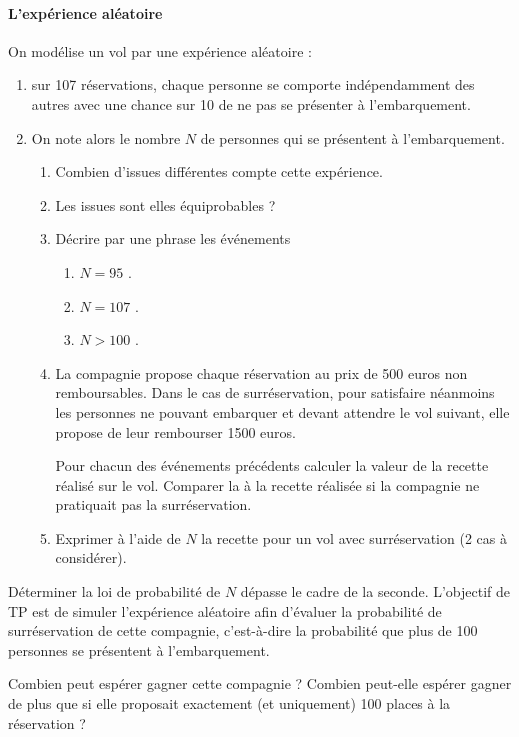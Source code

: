 \documentclass[main.tex]{subfiles}
\begin{document}
\paragraph{L'expérience aléatoire}
On modélise un vol par une expérience aléatoire :
\begin{enumerate}[label=\arabic*),leftmargin=*]
	\item sur 107 réservations, chaque personne se comporte indépendamment des autres avec une chance sur 10 de ne pas se présenter à l'embarquement.
	\item On note alors le nombre $N$ de personnes qui se présentent à l'embarquement.
 
\begin{enumerate}[label=\alph*),leftmargin=*]
	\item Combien d'issues différentes compte cette expérience.
	\item Les issues sont elles équiprobables ?
	\item Décrire par une phrase les événements 
	\begin{enumerate}[label={$\Alph*=$}]
		\item \og $N=95$ \fg.
		\item \og $N=107$ \fg.
		\item \og $N>100$ \fg.
	\end{enumerate} 
	\item  La compagnie propose chaque réservation au prix de 500 euros non remboursables. Dans le cas de
	surréservation, pour satisfaire néanmoins les personnes ne pouvant embarquer et devant attendre le vol suivant, elle propose de leur rembourser 1500 euros.
	
	Pour chacun des événements précédents calculer la valeur de la recette réalisé sur le vol. Comparer la à la recette réalisée si la compagnie ne pratiquait pas la surréservation.
	\item Exprimer à l'aide de $N$ la recette pour un vol avec surréservation (2 cas à considérer). 
\end{enumerate}
\end{enumerate} 
\begin{eBox}
Déterminer la loi de probabilité de $N$ dépasse le cadre de la seconde.  L'objectif de TP est de simuler l'expérience aléatoire afin d'évaluer la probabilité de surréservation de cette compagnie, c'est-à-dire la probabilité que plus de 100 personnes se présentent à l'embarquement.
  
\noindent Combien peut espérer gagner cette compagnie ? Combien peut-elle espérer gagner de plus que si elle proposait exactement (et uniquement) 100 places à la réservation ?
\end{eBox}
\end{document}
